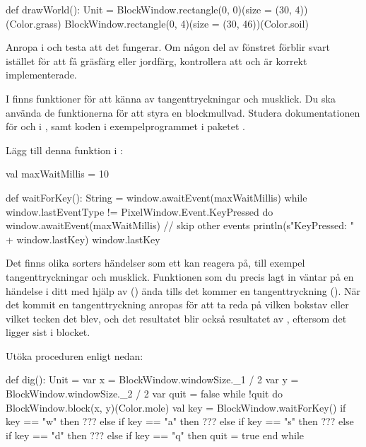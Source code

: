 \begin{Code}
def drawWorld(): Unit = 
  BlockWindow.rectangle(0, 0)(size = (30, 4))(Color.grass)
  BlockWindow.rectangle(0, 4)(size = (30, 46))(Color.soil)
\end{Code}

\Subtask Anropa  i  och testa att det fungerar. Om någon del av fönstret förblir svart istället för att få gräsfärg eller jordfärg, kontrollera att  och  är korrekt implementerade.

\Task
I  finns funktioner för att känna av tangenttryckningar och mus\-klick.
Du ska använda de funktionerna för att styra en blockmullvad. Studera dokumentationen för  och  i , samt koden i exempelprogrammet  i paketet .

\Subtask
Lägg till denna funktion i :
\begin{Code}
  val maxWaitMillis = 10

  def waitForKey(): String = 
    window.awaitEvent(maxWaitMillis)
    while window.lastEventType != PixelWindow.Event.KeyPressed do
      window.awaitEvent(maxWaitMillis) // skip other events
    println(s"KeyPressed: " + window.lastKey)
    window.lastKey
\end{Code}
\noindent Det finns olika sorters händelser som ett  kan reagera på, till exempel tangenttryckningar och musklick.
Funktionen som du precis lagt in väntar på en händelse i ditt  med hjälp av () ända tills det kommer en tangenttryckning ().
När det kommit en tangenttryckning anropas  för att ta reda på vilken bokstav eller vilket tecken det blev, och det resultatet blir också resultatet av , eftersom det ligger sist i blocket.

\Subtask
Utöka proceduren  enligt nedan:
\begin{Code}
  def dig(): Unit = 
    var x = BlockWindow.windowSize._1 / 2
    var y = BlockWindow.windowSize._2 / 2
    var quit = false
    while !quit do
      BlockWindow.block(x, y)(Color.mole)
      val key = BlockWindow.waitForKey()
      if      key == "w" then ???
      else if key == "a" then ???
      else if key == "s" then ???
      else if key == "d" then ???
      else if key == "q" then quit = true
    end while
\end{Code}

